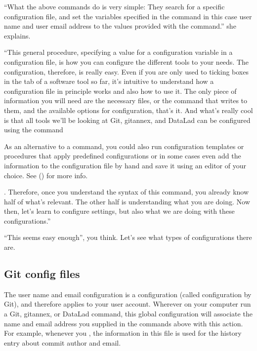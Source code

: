 \sphinxAtStartPar
“What the above commands do is very simple: They search for
a specific configuration file, and set the variables specified
in the command \textendash{} in this case user name and user email address
\textendash{} to the values provided with the command.” she explains.

\sphinxAtStartPar
“This general procedure, specifying a value for a configuration
variable in a configuration file, is how you can configure the
different tools to your needs. The configuration, therefore,
is really easy. Even if you are only used to ticking boxes
in the  tab of a software tool so far, it’s intuitive
to understand how a configuration file in principle works and also
how to use it. The only piece of information you will need
are the necessary files, or the command that writes to them, and
the available options for configuration, that’s it. And what’s
really cool is that all tools we’ll be looking at \textendash{} Git, git\sphinxhyphen{}annex,
and DataLad \textendash{} can be configured using the 
command%
\begin{footnote}\sphinxAtStartFootnote
As an alternative to a  command, you could also run configuration
templates or procedures that apply predefined configurations or in some cases even
add the information to the configuration file by hand and save it using an editor of your choice. See {\hyperref[\detokenize{basics/101-124-procedures:procedures}]{}} () for more info.
%
\end{footnote}. Therefore, once you understand the syntax of this
command, you already know half of what’s relevant. The other half
is understanding what you are doing. Now then, let’s learn 
to configure settings, but also  what we are doing
with these configurations.”

\sphinxAtStartPar
“This seems easy enough”, you think. Let’s see what types of
configurations there are.


\subsection{Git config files}
\label{\detokenize{basics/101-122-config:git-config-files}}
\sphinxAtStartPar
The user name and email configuration
is a  configuration (called 
configuration by Git), and therefore applies to your user account.
Wherever on your computer  run a Git, git\sphinxhyphen{}annex, or DataLad
command, this global configuration will
associate the name and email address you supplied in
the  commands above with this action.
For example, whenever you
, the information in this file is used for the
history entry about commit author and email.

